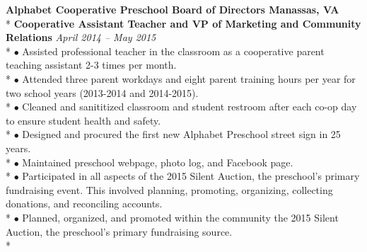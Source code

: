\documentclass{article}
\begin{document}
\begin{samepage}
\noindent \textbf{Alphabet Cooperative Preschool Board of Directors \hfill Manassas, VA} \\*
\textbf{Cooperative Assistant Teacher and VP of Marketing and Community Relations} \hfill \textit{April 2014 -- May 2015} \\*
\noindent $\bullet$ Assisted professional teacher in the classroom as a cooperative parent teaching assistant 2-3 times per month.\\*
\noindent $\bullet$ Attended three parent workdays and eight parent training hours per year for two school years (2013-2014 and 2014-2015).\\*
\noindent $\bullet$ Cleaned and sanititized classroom and student restroom after each co-op day to ensure student health and safety.\\*
\noindent $\bullet$ Designed and procured the first new Alphabet Preschool street sign in 25 years.\\*
\noindent $\bullet$ Maintained preschool webpage, photo log, and Facebook page.\\*
\noindent $\bullet$ Participated in all aspects of the 2015 Silent Auction, the preschool’s primary fundraising event. This involved
planning, promoting, organizing, collecting donations, and reconciling accounts.\\*
\noindent $\bullet$ Planned, organized, and promoted within the community the 2015 Silent Auction, the preschool’s primary
fundraising source.\\*
\end{samepage}
\end{document}
